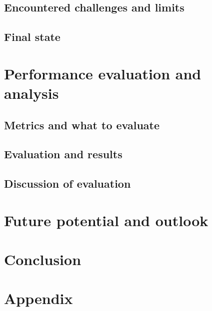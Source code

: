 \documentclass[12pt, a4paper]{article}
\begin{document}
    \subsection{ Encountered challenges and limits}
    \subsection{ Final state}
\section{ Performance evaluation and analysis}
    \subsection{ Metrics and what to evaluate}
    \subsection{ Evaluation and results}
    \subsection{ Discussion of evaluation}
\section{ Future potential and outlook}
\section{ Conclusion}

\newpage
\renewcommand{\thesubsection}{\Alph{subsection}}
\setcounter{page}{\value{lastroman}}
\section*{Appendix}


\newpage


\newpage
\listoffigures





\end{document}
